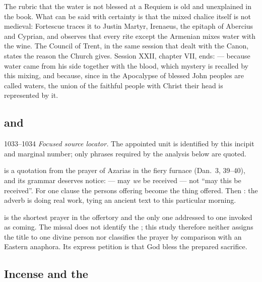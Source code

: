 The rubric that the water is not blessed at a Requiem is old and unexplained in
the book. What can be said with certainty is that the mixed chalice itself is
not medieval: Fortescue traces it to Justin Martyr, Irenaeus, the epitaph of
Abercius and Cyprian, and observes that every rite except the Armenian mixes
water with the wine. The Council of Trent, in the same session that dealt with
the Canon, states the reason the Church gives. Session XXII, chapter VII, ends:
 --- because water came from his side together with the blood,
which mystery is recalled by this mixing, and because, since in the Apocalypse
of blessed John peoples are called waters, the union of the faithful people
with Christ their head is represented by it.

\subsection*{ and }

\begin{appointed}{1033--1034}
\textit{Focused source locator.} The appointed unit is identified by this incipit and marginal number; only phrases required by the analysis below are quoted.
\end{appointed}

 is a quotation from the prayer of Azarias in
the fiery furnace (Dan.~3, 39--40), and its grammar deserves notice:
 --- may \emph{we} be received --- not ``may this be
received''. For one clause the persons offering become the thing offered. Then
: the adverb
 is doing real work, tying an ancient text to this particular
morning.

 is the shortest prayer in the offertory and the
only one addressed to one invoked as coming. The missal does not identify the
; this study therefore neither assigns the title to one
divine person nor classifies the prayer by comparison with an Eastern
anaphora. Its express petition is that God bless the prepared sacrifice.

\subsection*{Incense and the }

